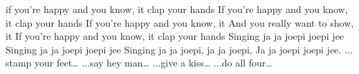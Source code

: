 \beginverse
if you’re happy and you know, it clap your hands
If you’re happy and you know, it clap your hands
If you’re happy and you know, it
And you really want to show, it
If you’re happy and you know, it clap your hands
\endverse
\beginchorus
Singing ja ja joepi joepi jee
Singing ja ja joepi joepi jee
Singing ja ja joepi, ja ja joepi,
Ja ja joepi joepi jee.
\endchorus
\beginverse
... stamp your feet…
\endverse
\beginverse
...say hey man…
\endverse
\beginverse
...give a kiss…
\endverse
\beginverse
...do all four…
\endverse
\endsong